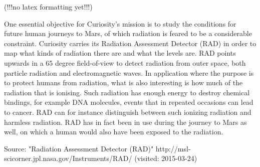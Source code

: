 (!!!no latex formatting yet!!!)

One essential objective for Curiosity's mission is to study the conditions for future human journeys to Mars, of which radiation is feared to be a considerable constraint.
 Curiosity carries its Radiation Assessment Detector (RAD) in order to map what kinds of radiation there are and what the levels are.
 RAD points upwards in a 65 degree field-of-view to detect radiation from outer space, both particle radiation and electromagnetic waves.
 In application where the purpose is to protect humans from radiation, what is also interesting is how much of the radiation that is ionising.
 Such radiation has enough energy to destroy chemical bindings, for example DNA molecules, events that in repeated occasions can lead to cancer.
 RAD can for instance distinguish between such ionizing radiation and harmless radiation.
 RAD has in fact been in use during the journey to Mars as well, on which a human would also have been exposed to the radiation.

Source:
"Radiation Assessment Detector (RAD)"
http://msl-scicorner.jpl.nasa.gov/Instruments/RAD/ (visited: 2015-03-24)